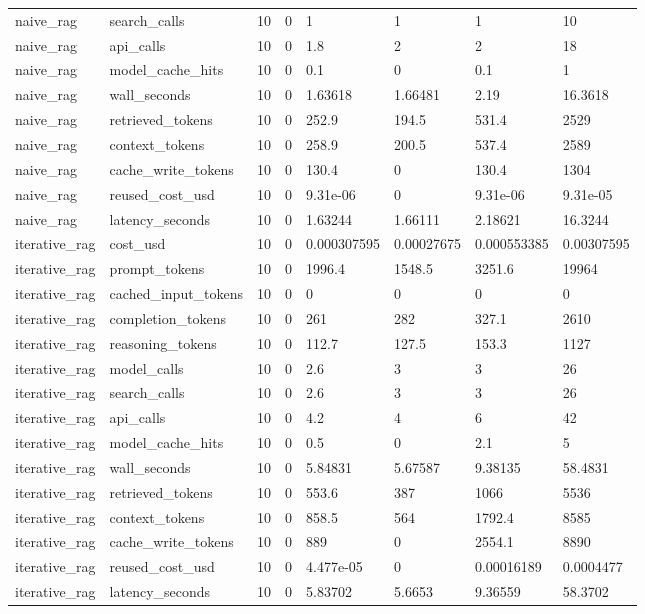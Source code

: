 \begin{tabular}{llllllll}
naive\_rag & search\_calls & 10 & 0 & 1 & 1 & 1 & 10 \\
naive\_rag & api\_calls & 10 & 0 & 1.8 & 2 & 2 & 18 \\
naive\_rag & model\_cache\_hits & 10 & 0 & 0.1 & 0 & 0.1 & 1 \\
naive\_rag & wall\_seconds & 10 & 0 & 1.63618 & 1.66481 & 2.19 & 16.3618 \\
naive\_rag & retrieved\_tokens & 10 & 0 & 252.9 & 194.5 & 531.4 & 2529 \\
naive\_rag & context\_tokens & 10 & 0 & 258.9 & 200.5 & 537.4 & 2589 \\
naive\_rag & cache\_write\_tokens & 10 & 0 & 130.4 & 0 & 130.4 & 1304 \\
naive\_rag & reused\_cost\_usd & 10 & 0 & 9.31e-06 & 0 & 9.31e-06 & 9.31e-05 \\
naive\_rag & latency\_seconds & 10 & 0 & 1.63244 & 1.66111 & 2.18621 & 16.3244 \\
iterative\_rag & cost\_usd & 10 & 0 & 0.000307595 & 0.00027675 & 0.000553385 & 0.00307595 \\
iterative\_rag & prompt\_tokens & 10 & 0 & 1996.4 & 1548.5 & 3251.6 & 19964 \\
iterative\_rag & cached\_input\_tokens & 10 & 0 & 0 & 0 & 0 & 0 \\
iterative\_rag & completion\_tokens & 10 & 0 & 261 & 282 & 327.1 & 2610 \\
iterative\_rag & reasoning\_tokens & 10 & 0 & 112.7 & 127.5 & 153.3 & 1127 \\
iterative\_rag & model\_calls & 10 & 0 & 2.6 & 3 & 3 & 26 \\
iterative\_rag & search\_calls & 10 & 0 & 2.6 & 3 & 3 & 26 \\
iterative\_rag & api\_calls & 10 & 0 & 4.2 & 4 & 6 & 42 \\
iterative\_rag & model\_cache\_hits & 10 & 0 & 0.5 & 0 & 2.1 & 5 \\
iterative\_rag & wall\_seconds & 10 & 0 & 5.84831 & 5.67587 & 9.38135 & 58.4831 \\
iterative\_rag & retrieved\_tokens & 10 & 0 & 553.6 & 387 & 1066 & 5536 \\
iterative\_rag & context\_tokens & 10 & 0 & 858.5 & 564 & 1792.4 & 8585 \\
iterative\_rag & cache\_write\_tokens & 10 & 0 & 889 & 0 & 2554.1 & 8890 \\
iterative\_rag & reused\_cost\_usd & 10 & 0 & 4.477e-05 & 0 & 0.00016189 & 0.0004477 \\
iterative\_rag & latency\_seconds & 10 & 0 & 5.83702 & 5.6653 & 9.36559 & 58.3702 \\

\end{tabular}
